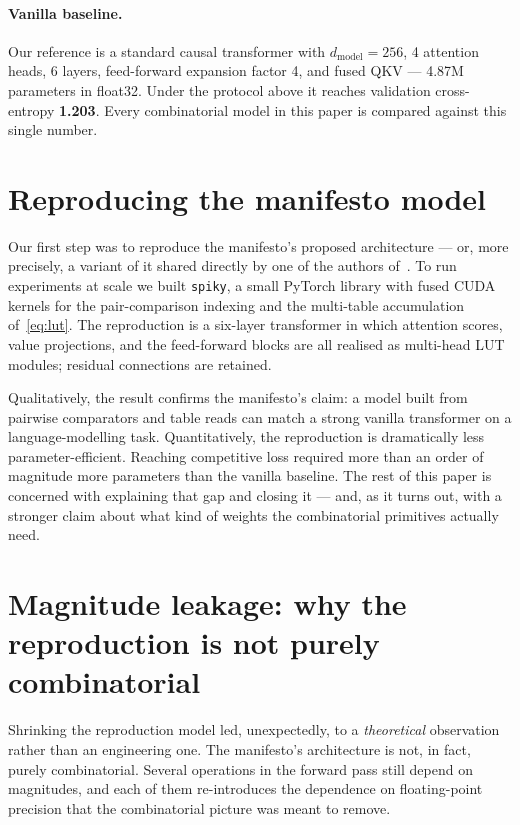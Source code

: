 \documentclass[11pt]{article}
\begin{document}
\paragraph{Vanilla baseline.}
Our reference is a standard causal transformer with $d_{\mathrm{model}} = 256$, 4 attention heads, 6 layers, feed-forward expansion factor 4, and fused QKV --- 4.87M parameters in float32.
Under the protocol above it reaches validation cross-entropy \textbf{1.203}.
Every combinatorial model in this paper is compared against this single number.


\section{Reproducing the manifesto model}
\label{sec:repro}

Our first step was to reproduce the manifesto's proposed architecture --- or, more precisely, a variant of it shared directly by one of the authors of~\cite{ref:manifesto}.
To run experiments at scale we built \texttt{spiky}, a small PyTorch library with fused CUDA kernels for the pair-comparison indexing and the multi-table accumulation of~\eqref{eq:lut}.
The reproduction is a six-layer transformer in which attention scores, value projections, and the feed-forward blocks are all realised as multi-head LUT modules; residual connections are retained.

Qualitatively, the result confirms the manifesto's claim: a model built from pairwise comparators and table reads can match a strong vanilla transformer on a language-modelling task.
Quantitatively, the reproduction is dramatically less parameter-efficient.
Reaching competitive loss required more than an order of magnitude more parameters than the vanilla baseline.
The rest of this paper is concerned with explaining that gap and closing it --- and, as it turns out, with a stronger claim about what kind of weights the combinatorial primitives actually need.


\section{Magnitude leakage: why the reproduction is not purely combinatorial}
\label{sec:leakage}

Shrinking the reproduction model led, unexpectedly, to a \emph{theoretical} observation rather than an engineering one.
The manifesto's architecture is not, in fact, purely combinatorial.
Several operations in the forward pass still depend on magnitudes, and each of them re-introduces the dependence on floating-point precision that the combinatorial picture was meant to remove.
\end{document}
